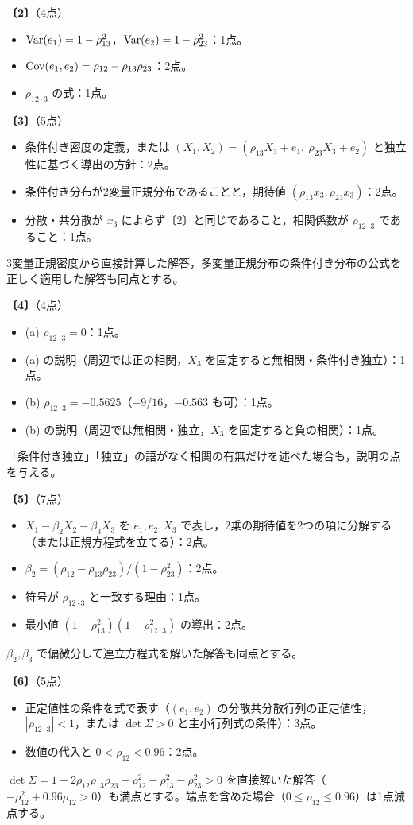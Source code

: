 \documentclass[a4paper,11pt]{ltjsarticle}
\renewcommand{\ans}[1]{\par\medskip\noindent\textbf{〔#1〕}\quad}
\renewcommand{\points}[1]{\hfill\textnormal{（#1点）}\par\nobreak}
\begin{document}
\ans{2}\points{4}
\begin{itemize}
\item $\operatorname{Var}(e_1)=1-\rho_{13}^2$，$\operatorname{Var}(e_2)=1-\rho_{23}^2$：1点。
\item $\operatorname{Cov}(e_1,e_2)=\rho_{12}-\rho_{13}\rho_{23}$：2点。
\item $\rho_{12\cdot3}$ の式：1点。
\end{itemize}

\ans{3}\points{5}
\begin{itemize}
\item 条件付き密度の定義，または $(X_1,X_2)=(\rho_{13}X_3+e_1,\ \rho_{23}X_3+e_2)$ と独立性に基づく導出の方針：2点。
\item 条件付き分布が2変量正規分布であることと，期待値 $(\rho_{13}x_3,\rho_{23}x_3)$：2点。
\item 分散・共分散が $x_3$ によらず〔2〕と同じであること，相関係数が $\rho_{12\cdot3}$ であること：1点。
\end{itemize}
3変量正規密度から直接計算した解答，多変量正規分布の条件付き分布の公式を正しく適用した解答も同点とする。

\ans{4}\points{4}
\begin{itemize}
\item (a) $\rho_{12\cdot3}=0$：1点。
\item (a) の説明（周辺では正の相関，$X_3$ を固定すると無相関・条件付き独立）：1点。
\item (b) $\rho_{12\cdot3}=-0.5625$（$-9/16$，$-0.563$ も可）：1点。
\item (b) の説明（周辺では無相関・独立，$X_3$ を固定すると負の相関）：1点。
\end{itemize}
「条件付き独立」「独立」の語がなく相関の有無だけを述べた場合も，説明の点を与える。

\ans{5}\points{7}
\begin{itemize}
\item $X_1-\beta_2X_2-\beta_3X_3$ を $e_1,e_2,X_3$ で表し，2乗の期待値を2つの項に分解する（または正規方程式を立てる）：2点。
\item $\beta_2=(\rho_{12}-\rho_{13}\rho_{23})/(1-\rho_{23}^2)$：2点。
\item 符号が $\rho_{12\cdot3}$ と一致する理由：1点。
\item 最小値 $(1-\rho_{13}^2)(1-\rho_{12\cdot3}^2)$ の導出：2点。
\end{itemize}
$\beta_2,\beta_3$ で偏微分して連立方程式を解いた解答も同点とする。

\ans{6}\points{5}
\begin{itemize}
\item 正定値性の条件を式で表す（$(e_1,e_2)$ の分散共分散行列の正定値性，$|\rho_{12\cdot3}|<1$，または $\det\Sigma>0$ と主小行列式の条件）：3点。
\item 数値の代入と $0<\rho_{12}<0.96$：2点。
\end{itemize}
$\det\Sigma=1+2\rho_{12}\rho_{13}\rho_{23}-\rho_{12}^2-\rho_{13}^2-\rho_{23}^2>0$ を直接解いた解答（$-\rho_{12}^2+0.96\rho_{12}>0$）も満点とする。端点を含めた場合（$0\le\rho_{12}\le0.96$）は1点減点する。
\end{document}
